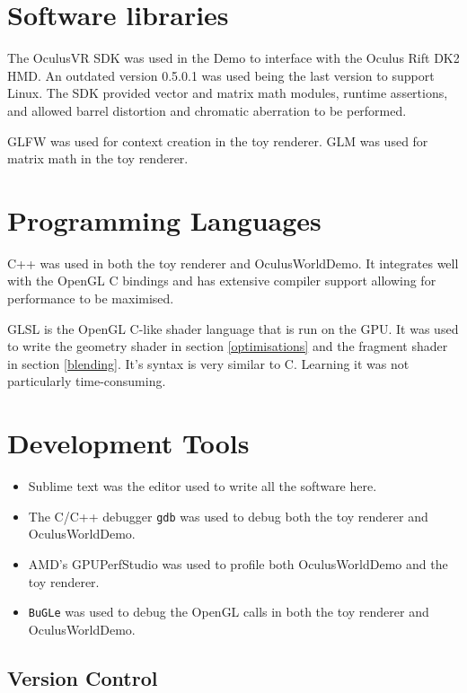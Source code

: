 \documentclass[12pt,a4paper,twoside,openright]{report}
\begin{document}
\section{Software libraries}

The OculusVR SDK was used in the Demo to interface with the Oculus Rift DK2 HMD. An outdated version 0.5.0.1 was used being the last version to support Linux.
The SDK provided vector and matrix math modules, runtime assertions, and allowed barrel distortion and chromatic aberration to be performed.

GLFW was used for context creation in the toy renderer.
GLM was used for matrix math in the toy renderer.

\section{Programming Languages}

C++ was used in both the toy renderer and OculusWorldDemo. It integrates well with the OpenGL C bindings and has extensive compiler support allowing for performance to be maximised.

GLSL is the OpenGL C-like shader language that is run on the GPU. It was used to write the geometry shader in section \ref{optimisations} and the fragment shader in section \ref{blending}. It's syntax is very similar to C. Learning it was not particularly time-consuming.

\section{Development Tools}

\begin{itemize}
\item Sublime text was the editor used to write all the software here.

\item The C/C++ debugger \texttt{gdb} was used to debug both the toy renderer and OculusWorldDemo.

\item AMD's GPUPerfStudio was used to profile both OculusWorldDemo and the toy renderer.

\item \texttt{BuGLe} was used to debug the OpenGL calls in both the toy renderer and OculusWorldDemo.

\end{itemize}
\subsection{Version Control}
\end{document}

